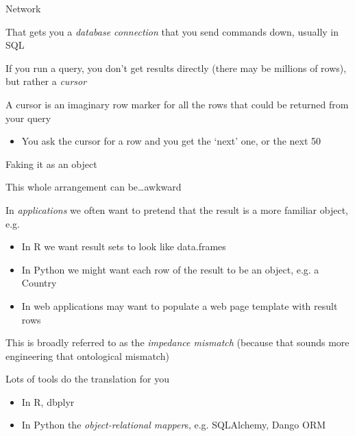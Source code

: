 \documentclass{hertieteaching}
\begin{document}
\begin{frame}{Network}

That gets you a \textit{database connection} that you send commands down, usually in \textsf{SQL}

If you run a query, you don't get results directly (there may be millions of rows), but rather a \textit{cursor}

A cursor is an imaginary row marker for all the rows that could be returned from your query
\begin{itemize}
  \item You ask the cursor for a row and you get the `next' one, or the next 50
\end{itemize}
	
\end{frame}
\begin{frame}{Faking it as an object}

This whole arrangement can be\ldots awkward

In \textit{applications} we often want to pretend that the result is a more familiar object, e.g.
\begin{itemize}
  \item In \textsf{R} we want result sets to look like \textsf{data.frame}s
  \item In \textsf{Python} we might want each row of the result to be an object, e.g. a \textsf{Country}
  \item In web applications may want to populate a web page template with result rows
\end{itemize}

This is broadly referred to as the \textit{impedance mismatch} (because that sounds more engineering that ontological mismatch)

Lots of tools do the translation for you
\begin{itemize}
  \item In \textsf{R}, \textsf{dbplyr}
  \item In \textsf{Python} the \textit{object-relational mapper}s, e.g. \textsf{SQLAlchemy}, \textsf{Dango ORM}
\end{itemize}

	
\end{frame}
\end{document}
